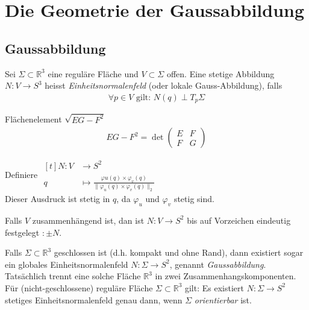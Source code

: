 \documentclass[../main.tex]{subfiles}
\begin{document}
\chapter{Die Geometrie der Gaussabbildung}

\section{Gaussabbildung}
\begin{definition}
    Sei $\Sigma \subset \mathbb{R}^{3}$ eine reguläre Fläche und $V \subset \Sigma$ offen. Eine stetige Abbildung $N:V \to S^3$ heisst \emph{Einheitsnormalenfeld} (oder lokale Gauss-Abbildung), falls 
    \begin{align*}
        \forall p \in V \text{ gilt: } N(q)\perp T_{p}\Sigma
    \end{align*}
\end{definition}
\begin{zusatz}
    Flächenelement $\sqrt{EG-F^{2}}$
    \begin{align*}
        EG-F^{2} = \det\begin{pmatrix} E & F \\ F & G \end{pmatrix}
    \end{align*}
\end{zusatz}
\begin{existence}
    Definiere $\begin{aligned}[t]
        N : V & \to S^{2} \\
        q & \mapsto \frac{\varphi{u}(q) \times \varphi_{v}(q)}{\lVert \varphi_{u}(q) \times \varphi_{v}(q) \rVert_{2}} 
    \end{aligned}$ \qquad \\
    Dieser Ausdruck ist stetig in $q$, da $\varphi_{u}$ und $\varphi_{v}$ stetig sind.
\end{existence}
\begin{uniqueness}
    Falls $V$ zusammenhängend ist, dan ist $N:V \to S^{2}$ bis auf Vorzeichen eindeutig festgelegt $:\pm N$.
\end{uniqueness}
\begin{remark}
    Falls $\Sigma \subset \mathbb{R}^{3}$ geschlossen ist (d.h. kompakt und ohne Rand), dann existiert sogar ein globales Einheitsnormalenfeld $N:\Sigma \to S^{2}$, genannt \emph{Gaussabbildung}.
    Tatsächlich trennt eine solche Fläche $\mathbb{R}^{3}$ in zwei Zusammenhangskomponenten. Für (nicht-geschlossene) reguläre Fläche $\Sigma \subset \mathbb{R}^{3}$ gilt: Es existiert $N:\Sigma \to S^{2}$ stetiges Einheitsnormalenfeld genau dann,
    wenn $\Sigma$ \emph{orientierbar} ist.
\end{remark}
\end{document}
